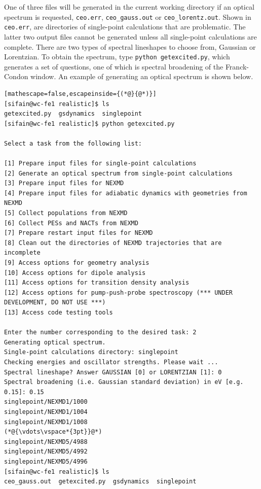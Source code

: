 \documentclass[letterpaper,12pt,titlepage]{article}
\begin{document}
One of three files will be generated in the current working directory if an optical spectrum is requested, \verb+ceo.err+, \verb+ceo_gauss.out+ or \verb+ceo_lorentz.out+.  Shown in \verb+ceo.err+, are directories of single-point calculations that are problematic.  The latter two output files cannot be generated unless all single-point calculations are complete.  There are two types of spectral lineshapes to choose from, Gaussian or Lorentzian.  To obtain the spectrum, type \verb+python getexcited.py+, which generates a set of questions, one of which is spectral broadening of the Franck-Condon window.  An example of generating an optical spectrum is shown below.
\newline
\begin{lstlisting}[mathescape=false,escapeinside={(*@}{@*)}]
[sifain@wc-fe1 realistic]$ ls
getexcited.py  gsdynamics  singlepoint
[sifain@wc-fe1 realistic]$ python getexcited.py 

Select a task from the following list:

[1] Prepare input files for single-point calculations
[2] Generate an optical spectrum from single-point calculations
[3] Prepare input files for NEXMD
[4] Prepare input files for adiabatic dynamics with geometries from NEXMD
[5] Collect populations from NEXMD
[6] Collect PESs and NACTs from NEXMD
[7] Prepare restart input files for NEXMD
[8] Clean out the directories of NEXMD trajectories that are incomplete
[9] Access options for geometry analysis
[10] Access options for dipole analysis
[11] Access options for transition density analysis
[12] Access options for pump-push-probe spectroscopy (*** UNDER DEVELOPMENT, DO NOT USE ***)
[13] Access code testing tools

Enter the number corresponding to the desired task: 2
Generating optical spectrum.
Single-point calculations directory: singlepoint
Checking energies and oscillator strengths. Please wait ...
Spectral lineshape? Answer GAUSSIAN [0] or LORENTZIAN [1]: 0
Spectral broadening (i.e. Gaussian standard deviation) in eV [e.g. 0.15]: 0.15
singlepoint/NEXMD1/1000
singlepoint/NEXMD1/1004
singlepoint/NEXMD1/1008
(*@{\vdots\vspace*{3pt}}@*)
singlepoint/NEXMD5/4988
singlepoint/NEXMD5/4992
singlepoint/NEXMD5/4996
[sifain@wc-fe1 realistic]$ ls
ceo_gauss.out  getexcited.py  gsdynamics  singlepoint
\end{lstlisting}
\end{document}

